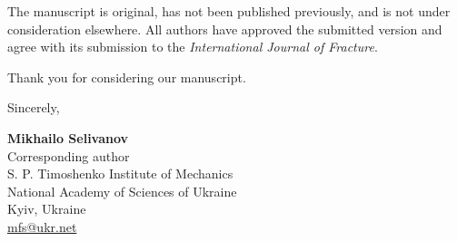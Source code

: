 \documentclass[11pt,a4paper]{article}
\begin{document}
The manuscript is original, has not been published previously, and is not
under consideration elsewhere. All authors have approved the submitted
version and agree with its submission to the \textit{International Journal
of Fracture}.

Thank you for considering our manuscript.

Sincerely,

\textbf{Mikhailo Selivanov}\\
Corresponding author\\
S. P. Timoshenko Institute of Mechanics\\
National Academy of Sciences of Ukraine\\
Kyiv, Ukraine\\
\href{mailto:mfs@ukr.net}{mfs@ukr.net}
\end{document}
